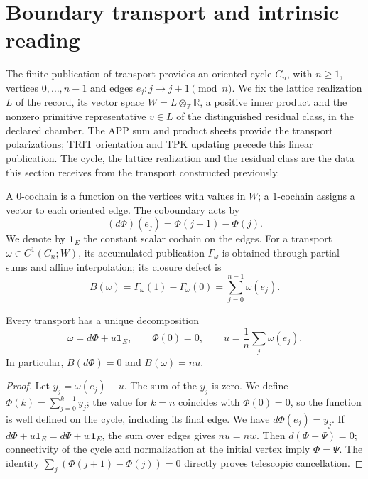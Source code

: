 \section{Boundary transport and intrinsic reading}
\label{x_reciprocidad:vii:sec:observador-ciclo}

The finite publication of transport provides an oriented cycle
\(C_n\), with \(n\geq1\), vertices \(0,\ldots,n-1\) and edges
\(e_j:j\longrightarrow j+1\pmod n\). We fix the lattice realization
\(L\) of the record, its vector space
\(W=L\otimes_{\mathbb Z}\mathbb R\), a positive inner product and
the nonzero primitive representative \(v\in L\) of the distinguished residual
class, in the declared chamber. The APP sum and product sheets
provide the transport polarizations; TRIT orientation and
TPK updating precede this linear publication. The cycle,
the lattice realization and the residual class are the data this
section receives from the transport constructed previously.

A \(0\)-cochain is a function on the vertices with values in
\(W\); a \(1\)-cochain assigns a vector to each oriented edge.
The coboundary acts by
\[
 (d\Phi)(e_j)=\Phi(j+1)-\Phi(j).
\]
We denote by \(\mathbf1_E\) the constant scalar cochain on the
edges. For a transport \(\omega\in C^1(C_n;W)\), its accumulated
publication \(\Gamma_\omega\) is obtained through partial sums and
affine interpolation; its closure defect is
\begin{equation}
 B(\omega)=\Gamma_\omega(1)-\Gamma_\omega(0)
 =\sum_{j=0}^{n-1}\omega(e_j).
 \label{x_reciprocidad:vii:eq:observador-defecto}
\end{equation}

\begin{theorem}
\label{x_reciprocidad:vii:thm:observador-descomposicion}
Every transport has a unique decomposition
\[
 \omega=d\Phi+u\mathbf1_E,\qquad \Phi(0)=0,
 \qquad u=\frac1n\sum_j\omega(e_j).
\]
In particular, \(B(d\Phi)=0\) and \(B(\omega)=nu\).
\end{theorem}

\begin{proof}
Let \(y_j=\omega(e_j)-u\). The sum of the \(y_j\) is zero.
We define \(\Phi(k)=\sum_{j=0}^{k-1}y_j\); the value for \(k=n\)
coincides with \(\Phi(0)=0\), so the function is well defined
on the cycle, including its final edge. We have \(d\Phi(e_j)=y_j\).
If \(d\Phi+u\mathbf1_E=d\Psi+w\mathbf1_E\), the sum over edges gives
\(nu=nw\). Then \(d(\Phi-\Psi)=0\); connectivity of the cycle
and normalization at the initial vertex imply \(\Phi=\Psi\).
The identity \(\sum_j(\Phi(j+1)-\Phi(j))=0\) directly proves
telescopic cancellation.
\end{proof}

